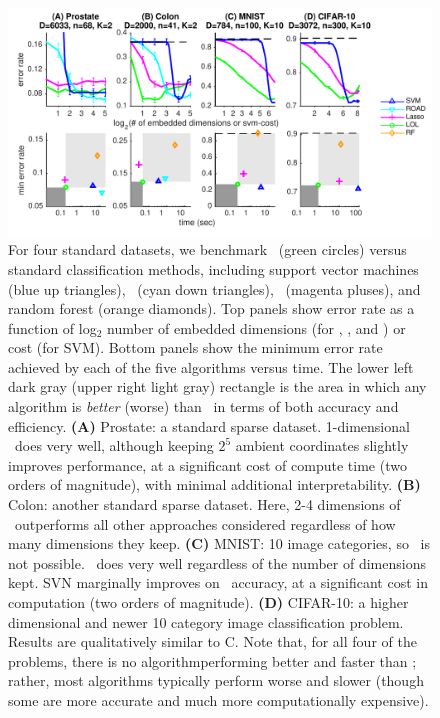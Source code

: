 \documentclass[10pt]{article}
\begin{document}
\begin{figure}
\centering
\includegraphics[width=1\linewidth]{../Figs/realdata}
\caption{
For four standard datasets, we benchmark \Lol~(green circles) versus standard classification methods, including support vector machines (blue up triangles), \Road~(cyan down triangles), ~(magenta pluses), and random forest (orange diamonds).
Top panels show error rate as a function of log$_2$ number of embedded dimensions (for \Lol, \Road, and ) or cost (for SVM).
Bottom panels show the minimum error rate achieved by each of the five algorithms versus time.
The lower left dark gray (upper right light gray) rectangle is the area in which any algorithm is \emph{better}  (worse) than \Lol~in terms of both accuracy and efficiency.
\textbf{(A)} Prostate: a standard sparse dataset.  1-dimensional \Lol~does very well, although keeping $2^5$ ambient coordinates slightly improves performance, at a significant cost of compute time (two orders of magnitude), with minimal additional interpretability.
\textbf{(B)} Colon: another standard sparse dataset.  Here, 2-4 dimensions of \Lol~outperforms all other approaches considered regardless of how many dimensions they keep.
\textbf{(C)} MNIST: 10 image categories, so \Road~is not possible.  \Lol~does very well regardless of the number of dimensions kept.  SVN marginally improves on \Lol~accuracy, at a significant cost in computation (two orders of magnitude).
\textbf{(D)} CIFAR-10: a higher dimensional and newer 10 category image classification problem.  Results are qualitatively similar to C.
%
Note that, for all four of the problems, there is no algorithmperforming better and faster than \Lol; rather, most algorithms typically perform worse and slower (though some are more accurate and much more computationally expensive).
}
\label{f:realdata}
\end{figure}
\end{document}
